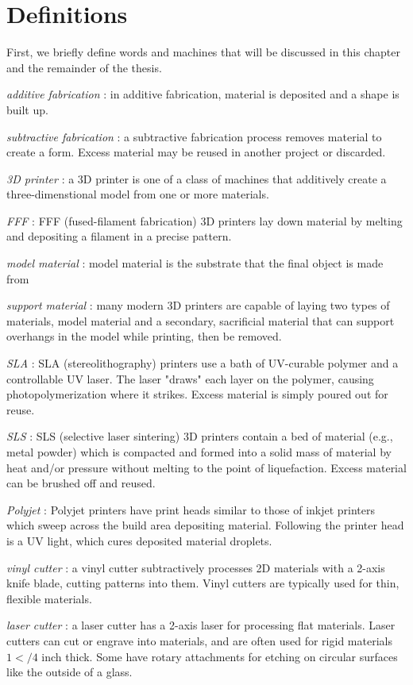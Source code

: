 \section{Definitions}

First, we briefly define words and machines that will be discussed in this chapter and the remainder of the thesis.

\emph{additive fabrication} : in additive fabrication, material is deposited and a shape is built up.

\emph{subtractive fabrication} : a subtractive fabrication process removes material to create a form. Excess material may be reused in another project or discarded.

\emph{3D printer} : a 3D printer is one of a class of machines that additively create a three-dimenstional model from one or more materials.

\emph{FFF} : FFF (fused-filament fabrication) 3D printers lay down material by melting and depositing a filament in a precise pattern.

\emph{model material} : model material is the substrate that the final object is made from

\emph{support material} : many modern 3D printers are capable of laying two types of materials, model material and a secondary, sacrificial material that can support overhangs in the model while printing, then be removed.

\emph{SLA} : SLA (stereolithography) printers use a bath of UV-curable polymer and a controllable UV laser. The laser "draws" each layer on the polymer, causing photopolymerization where it strikes. Excess material is simply poured out for reuse.

\emph{SLS} : SLS (selective laser sintering) 3D printers contain a bed of material (e.g., metal powder) which is compacted and formed into a solid mass of material by heat and/or pressure without melting to the point of liquefaction. Excess material can be brushed off and reused.

\emph{Polyjet} : Polyjet printers have print heads similar to those of inkjet printers which sweep across the build area depositing material. Following the printer head is a UV light, which cures deposited material droplets.

\emph{vinyl cutter} : a vinyl cutter subtractively processes 2D materials with a 2-axis knife blade, cutting patterns into them. Vinyl cutters are typically used for thin, flexible materials.

\emph{laser cutter} : a laser cutter has a 2-axis laser for processing flat materials. Laser cutters can cut or engrave into materials, and are often used for rigid materials $1</4$ inch thick. Some have rotary attachments for etching on circular surfaces like the outside of a glass.

